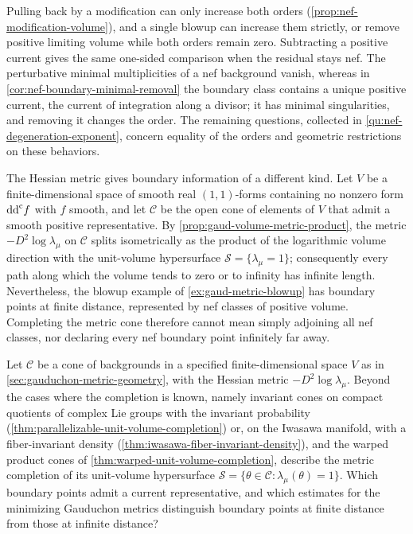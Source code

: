 Pulling back by a modification can only increase both orders (\cref{prop:nef-modification-volume}), and a single blowup can increase them strictly, or remove positive limiting volume while both orders remain zero. Subtracting a positive current gives the same one-sided comparison when the residual stays nef. The perturbative minimal multiplicities of a nef background vanish, whereas in \cref{cor:nef-boundary-minimal-removal} the boundary class contains a unique positive current, the current of integration along a divisor; it has minimal singularities, and removing it changes the order. The remaining questions, collected in \cref{qu:nef-degeneration-exponent}, concern equality of the orders and geometric restrictions on these behaviors.

The Hessian metric gives boundary information of a different kind. Let $V$ be a finite-dimensional space of smooth real $(1,1)$-forms containing no nonzero form $\mathrm{dd}^{\mathrm{c}} f$ with $f$ smooth, and let $\mathscr C$ be the open cone of elements of $V$ that admit a smooth positive representative. By \cref{prop:gaud-volume-metric-product}, the metric $-D^2\log\lambda_\mu$ on $\mathscr C$ splits isometrically as the product of the logarithmic volume direction with the unit-volume hypersurface $\mathscr S=\{\lambda_\mu=1\}$; consequently every path along which the volume tends to zero or to infinity has infinite length. Nevertheless, the blowup example of \cref{ex:gaud-metric-blowup} has boundary points at finite distance, represented by nef classes of positive volume. Completing the metric cone therefore cannot mean simply adjoining all nef classes, nor declaring every nef boundary point infinitely far away.

\begin{problem}\label{qu:gaud-metric-boundary}
Let $\mathscr C$ be a cone of backgrounds in a specified finite-dimensional space $V$ as in \cref{sec:gauduchon-metric-geometry}, with the Hessian metric $-D^2\log\lambda_\mu$. Beyond the cases where the completion is known, namely invariant cones on compact quotients of complex Lie groups with the invariant probability (\cref{thm:parallelizable-unit-volume-completion}) or, on the Iwasawa manifold, with a fiber-invariant density (\cref{thm:iwasawa-fiber-invariant-density}), and the warped product cones of \cref{thm:warped-unit-volume-completion}, describe the metric completion of its unit-volume hypersurface $\mathscr S=\{\theta\in\mathscr C:\lambda_\mu(\theta)=1\}$. Which boundary points admit a current representative, and which estimates for the minimizing Gauduchon metrics distinguish boundary points at finite distance from those at infinite distance?
\end{problem}

